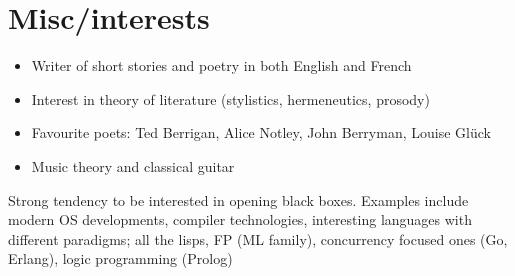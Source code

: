 \documentclass{article}
\begin{document}
\section*{Misc/interests}
\begin{itemize}
  \item Writer of short stories and poetry in both English and French
  \item Interest in theory of literature (stylistics, hermeneutics, prosody)
  \item Favourite poets: Ted Berrigan, Alice Notley, John Berryman, Louise Gl\"uck 
  \item Music theory and classical guitar
\end{itemize}

Strong tendency to be interested in opening black boxes. Examples include
modern OS developments, compiler technologies, interesting languages with different paradigms;
all the lisps, FP (ML family), concurrency focused ones (Go, Erlang), logic programming (Prolog)
\end{document}
